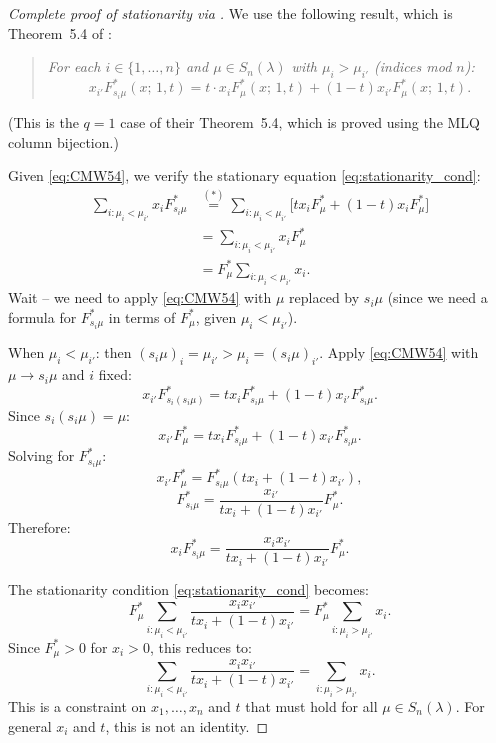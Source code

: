 \documentclass[12pt]{article}
\theoremstyle{definition}
\begin{document}
\begin{proof}[Complete proof of stationarity via \cite{CMW22}]

We use the following result, which is Theorem~5.4 of \cite{CMW22}:

\begin{quote}
\textit{For each $i \in \{1,\dots,n\}$ and $\mu \in S_n(\lambda)$ with
$\mu_i > \mu_{i'}$ (indices mod $n$):
\begin{equation}\label{eq:CMW54}
  x_{i'} F^*_{s_i\mu}(x;\,1,t) = t \cdot x_i F^*_\mu(x;\,1,t)
  + (1-t) x_{i'} F^*_\mu(x;\,1,t).
\end{equation}}
\end{quote}

(This is the $q=1$ case of their Theorem~5.4, which is proved using the MLQ
column bijection.)

Given \eqref{eq:CMW54}, we verify the stationary equation
\eqref{eq:stationarity_cond}:
\begin{align*}
  \sum_{i: \mu_i < \mu_{i'}} x_i F^*_{s_i\mu}
  &\overset{(*)}{=} \sum_{i: \mu_i < \mu_{i'}}
    \bigl[ t x_i F^*_\mu + (1-t) x_i F^*_\mu \bigr] \\
  &= \sum_{i: \mu_i < \mu_{i'}} x_i F^*_\mu \\
  &= F^*_\mu \sum_{i: \mu_i < \mu_{i'}} x_i.
\end{align*}
Wait -- we need to apply \eqref{eq:CMW54} with $\mu$ replaced by $s_i\mu$
(since we need a formula for $F^*_{s_i\mu}$ in terms of $F^*_\mu$, given
$\mu_i < \mu_{i'}$).

When $\mu_i < \mu_{i'}$: then $(s_i\mu)_i = \mu_{i'} > \mu_i = (s_i\mu)_{i'}$.
Apply \eqref{eq:CMW54} with $\mu \to s_i\mu$ and $i$ fixed:
\[
  x_{i'} F^*_{s_i(s_i\mu)} = t x_i F^*_{s_i\mu} + (1-t) x_{i'} F^*_{s_i\mu}.
\]
Since $s_i(s_i\mu) = \mu$:
\[
  x_{i'} F^*_\mu = t x_i F^*_{s_i\mu} + (1-t) x_{i'} F^*_{s_i\mu}.
\]
Solving for $F^*_{s_i\mu}$:
\[
  x_{i'} F^*_\mu = F^*_{s_i\mu}(t x_i + (1-t) x_{i'}),
\]
\[
  F^*_{s_i\mu} = \frac{x_{i'}}{t x_i + (1-t) x_{i'}} F^*_\mu.
\]
Therefore:
\[
  x_i F^*_{s_i\mu} = \frac{x_i x_{i'}}{t x_i + (1-t) x_{i'}} F^*_\mu.
\]

The stationarity condition \eqref{eq:stationarity_cond} becomes:
\[
  F^*_\mu \sum_{i: \mu_i < \mu_{i'}} \frac{x_i x_{i'}}{t x_i + (1-t) x_{i'}}
  = F^*_\mu \sum_{i: \mu_i > \mu_{i'}} x_i.
\]
Since $F^*_\mu > 0$ for $x_i > 0$, this reduces to:
\begin{equation}\label{eq:numcheck}
  \sum_{i: \mu_i < \mu_{i'}} \frac{x_i x_{i'}}{t x_i + (1-t) x_{i'}}
  = \sum_{i: \mu_i > \mu_{i'}} x_i.
\end{equation}
This is a constraint on $x_1,\dots,x_n$ and $t$ that must hold for all
$\mu \in S_n(\lambda)$.  For general $x_i$ and $t$, this is not an identity.


\end{proof}
\end{document}
